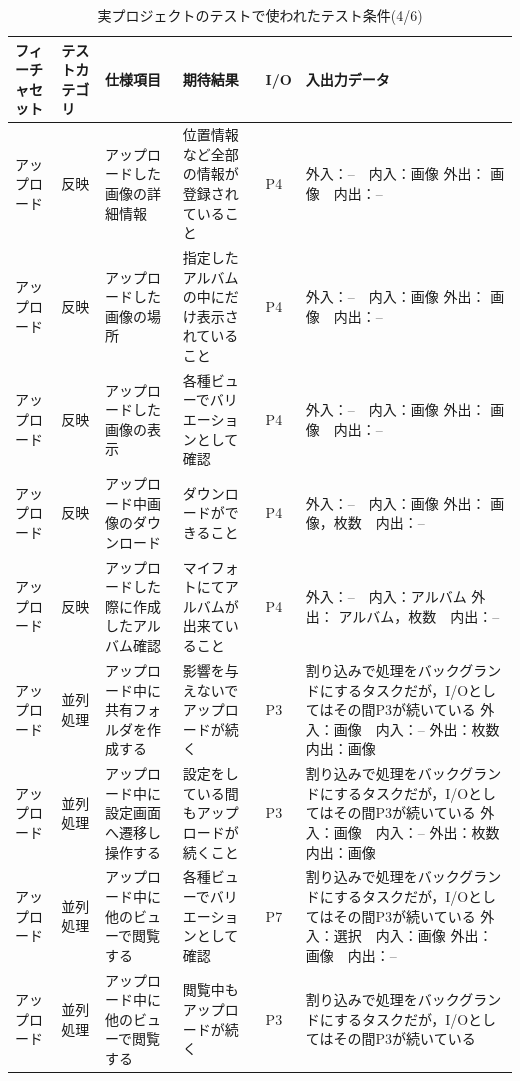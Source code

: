 \begin{table}[htbp]
  \scriptsize
  \centering
  \caption{実プロジェクトのテストで使われたテスト条件(4/6)}
  \begin{tabular}{|p{8em}|p{7em}|p{9em}|p{9em}|p{3em}|p{12em}|}
\cline{1-6}   フィーチャセット & テストカテゴリ  & 仕様項目 & 期待結果  & I/O   & 入出力データ \bigstrut\\
    \hline
    \hline
    アップロード & 反映    & アップロードした画像の詳細情報 & 位置情報など全部の情報が登録されていること & P4    & 外入：--　内入：画像
外出： 画像　内出：-- \bigstrut\\
    \hline
    アップロード & 反映    & アップロードした画像の場所 & 指定したアルバムの中にだけ表示されていること & P4    & 外入：--　内入：画像
外出： 画像　内出：-- \bigstrut\\
    \hline
    アップロード & 反映    & アップロードした画像の表示 & 各種ビューでバリエーションとして確認 & P4    & 外入：--　内入：画像
外出： 画像　内出：-- \bigstrut\\
    \hline
    アップロード & 反映    & アップロード中画像のダウンロード & ダウンロードができること & P4    & 外入：--　内入：画像
外出： 画像，枚数　内出：-- \bigstrut\\
    \hline
    アップロード & 反映    & アップロードした際に作成したアルバム確認 & マイフォトにてアルバムが出来ていること & P4    & 外入：--　内入：アルバム
外出： アルバム，枚数　内出：-- \bigstrut\\
    \hline
    アップロード & 並列処理  & アップロード中に共有フォルダを作成する & 影響を与えないでアップロードが続く & P3    & 割り込みで処理をバックグランドにするタスクだが，I/Oとしてはその間P3が続いている
外入：画像　内入：--
外出：枚数　内出：画像 \bigstrut\\
    \hline
    アップロード & 並列処理  & アップロード中に設定画面へ遷移し操作する & 設定をしている間もアップロードが続くこと & P3    & 割り込みで処理をバックグランドにするタスクだが，I/Oとしてはその間P3が続いている
外入：画像　内入：--
外出：枚数　内出：画像 \bigstrut\\
    \hline
    アップロード & 並列処理  & アップロード中に他のビューで閲覧する & 各種ビューでバリエーションとして確認 & P7    & 割り込みで処理をバックグランドにするタスクだが，I/Oとしてはその間P3が続いている
外入：選択　内入：画像
外出：画像　内出：-- \bigstrut\\
    \hline
    アップロード & 並列処理  & アップロード中に他のビューで閲覧する & 閲覧中もアップロードが続く & P3    & 割り込みで処理をバックグランドにするタスクだが，I/Oとしてはその間P3が続いている

\end{tabular}
\end{table}
